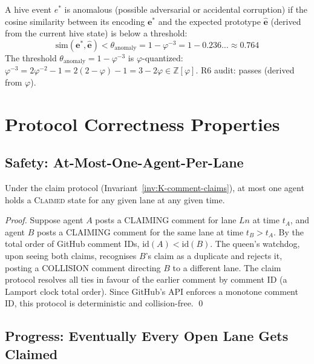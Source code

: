 A hive event $e^*$ is anomalous (possible adversarial or accidental
corruption) if the cosine similarity between its encoding $\mathbf{e}^*$
and the expected prototype $\hat{\mathbf{e}}$ (derived from the current
hive state) is below a threshold:
\[
  \mathrm{sim}(\mathbf{e}^*, \hat{\mathbf{e}}) < \theta_{\text{anomaly}}
  = 1 - \varphi^{-3} = 1 - 0.236\ldots \approx 0.764
\]
The threshold $\theta_{\text{anomaly}} = 1 - \varphi^{-3}$ is
$\varphi$-quantized: $\varphi^{-3} = 2\varphi^{-2} - 1
= 2(2-\varphi) - 1 = 3 - 2\varphi \in \mathbb{Z}[\varphi]$.
R6 audit: passes (derived from $\varphi$).


\section{Protocol Correctness Properties}
\label{sec:K-correctness}

\subsection{Safety: At-Most-One-Agent-Per-Lane}
\label{ssec:K-safety}

\begin{proposition}
\label{prop:K-safety}
Under the claim protocol
(Invariant~\ref{inv:K-comment-claims}), at most one agent holds a
\textsc{Claimed} state for any given lane at any given time.
\end{proposition}
\begin{proof}
Suppose agent $A$ posts a CLAIMING comment for lane $Ln$ at time
$t_A$, and agent $B$ posts a CLAIMING comment for the same lane at
time $t_B > t_A$. By the total order of GitHub comment IDs,
$\text{id}(A) < \text{id}(B)$. The queen's watchdog, upon seeing
both claims, recognises $B$'s claim as a duplicate and rejects it,
posting a COLLISION comment directing $B$ to a different lane.
The claim protocol resolves all ties in favour of the earlier
comment by comment ID (a Lamport clock total order). Since
GitHub's API enforces a monotone comment ID, this protocol is
deterministic and collision-free.
\qed
\end{proof}

\subsection{Progress: Eventually Every Open Lane Gets Claimed}
\label{ssec:K-progress}

